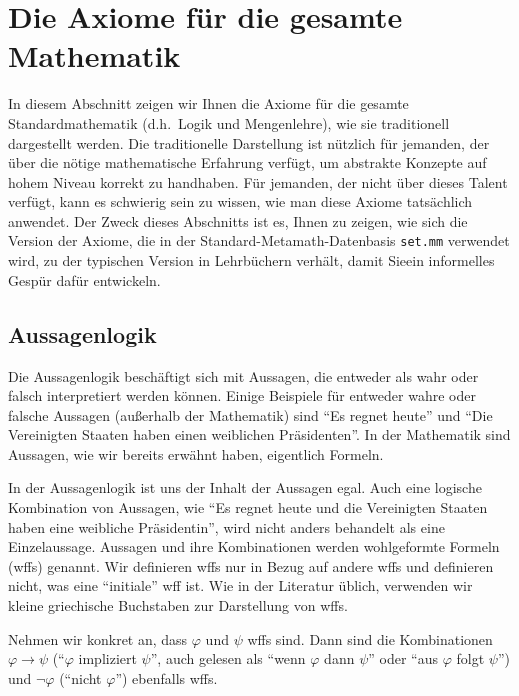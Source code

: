 \section{Die Axiome für die gesamte Mathematik}

In diesem Abschnitt zeigen wir Ihnen die Axiome für die gesamte Standardmathematik (d.h.\ Logik und Mengenlehre), wie sie traditionell dargestellt werden.  Die traditionelle Darstellung ist nützlich für jemanden, der über die nötige mathematische Erfahrung verfügt, um abstrakte Konzepte auf hohem Niveau korrekt zu handhaben.  Für jemanden, der nicht über dieses Talent verfügt, kann es schwierig sein zu wissen, wie man diese Axiome tatsächlich anwendet.  Der Zweck dieses Abschnitts ist es, Ihnen zu zeigen, wie sich die Version der Axiome, die in der Standard-Metamath-Datenbasis \texttt{set.mm} verwendet wird, zu der typischen Version in Lehrbüchern verhält, damit Sieein informelles Gespür dafür entwickeln.

\subsection{Aussagenlogik}

Die Aussagenlogik beschäftigt sich mit Aussagen, die entweder als wahr oder falsch interpretiert werden können.  Einige Beispiele für entweder wahre oder falsche Aussagen (außerhalb der Mathematik) sind "`Es regnet heute"' und "`Die Vereinigten Staaten haben einen weiblichen Präsidenten"'. In der Mathematik sind Aussagen, wie wir bereits erwähnt haben, eigentlich Formeln.

In der Aussagenlogik ist uns der Inhalt der Aussagen egal.  Auch eine logische Kombination von Aussagen, wie "`Es regnet heute und die Vereinigten Staaten haben eine weibliche Präsidentin"', wird nicht anders behandelt als eine Einzelaussage.  Aussagen und ihre Kombinationen werden wohlgeformte Formeln (wffs) genannt.  Wir definieren wffs nur in Bezug auf andere wffs und definieren nicht, was eine "`initiale"' wff ist.  Wie in der Literatur üblich, verwenden wir kleine  griechische Buchstaben zur Darstellung von wffs.

Nehmen wir konkret an, dass $\varphi$ und $\psi$ wffs sind.  Dann sind die Kombinationen $\varphi\rightarrow\psi$ ("`$\varphi$ impliziert $\psi$"', auch gelesen als "`wenn $\varphi$ dann $\psi$"' oder "`aus $\varphi$ folgt $\psi$"') und $\lnot\varphi$ ("`nicht $\varphi$"') ebenfalls wffs.

